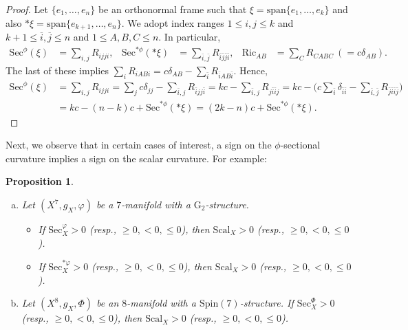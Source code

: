 \documentclass[11pt]{article}
\newcommand{\Spin}{\mathrm{Spin}}
\newcommand{\G}{\mathrm{G}}
\newtheorem{prop}[thm]{Proposition}
\theoremstyle{definition}
\numberwithin{equation}{section}
\begin{document}
\begin{proof} Let $\{e_1, \ldots, e_n\}$ be an orthonormal frame such that $\xi = \mathrm{span}\{e_1, \ldots, e_k\}$ and also $\ast \xi = \mathrm{span}\{e_{k+1}, \ldots, e_n\}$.  We adopt index ranges $1 \leq i,j \leq k$ and $k+1 \leq \overline{i}, \overline{j} \leq n$ and $1 \leq A,B,C \leq n$.  In particular,
\begin{align*}
\mathrm{Sec}^\phi(\xi) & = \sum_{i,j} R_{ijji}, & \mathrm{Sec}^{\ast \phi}(\ast \xi) & = \sum_{\bar{i},\bar{j}} R_{\bar{i} \bar{j} \bar{j} \bar{i}}, & \displaystyle \operatorname{Ric}_{AB} & = \sum_C R_{CABC}\ (=c\delta_{AB}).
\end{align*}
The last of these implies $\displaystyle \sum_i R_{iABi} = c \delta_{AB}- \sum_{\bar{i}} R_{\bar{i} AB \bar{i}}$. Hence,
\begin{align*}
    \mathrm{Sec}^\phi(\xi) & = \sum_{i,j} R_{ijji} = \sum_j c\delta_{jj}- \sum_{\bar{i},j} R_{\bar{i} j j\bar{i}} = kc - \sum_{\bar{i},j} R_{j \bar{i}\bar{i} j} = kc -\Big(c\sum_{\bar{i}} \delta_{\bar{i} \bar{i}} - \sum_{\bar{i},\bar{j}} R_{\bar{j} \bar{i} \bar{i} \bar{j}} \Big)\\
    &= kc - (n-k)c + \mathrm{Sec}^{\ast \phi}(\ast \xi) = (2k-n)c + \mathrm{Sec}^{\ast \phi}(\ast \xi).
\end{align*}
\end{proof}

Next, we observe that in certain cases of interest, a sign on the $\phi$-sectional curvature implies a sign on the scalar curvature.  For example:

\begin{prop} ${}$
\begin{enumerate}[(a)]
\item Let $(X^7, g_X, \varphi)$ be a $7$-manifold with a $\G_2$-structure.
\begin{itemize}
\item If $\mathrm{Sec}^\varphi_X > 0$ (resp., $\geq 0, < 0, \leq 0$), then $\mathrm{Scal}_X > 0$ (resp., $\geq 0, < 0, \leq 0$).
\item If $\mathrm{Sec}^{\ast \varphi}_X > 0$ (resp., $\geq 0, < 0, \leq 0$), then $\mathrm{Scal}_X > 0$ (resp., $\geq 0, < 0, \leq 0$).
\end{itemize}
\item Let $(X^8, g_X, \Phi)$ be an $8$-manifold with a $\Spin(7)$-structure.  If $\mathrm{Sec}^\Phi_X > 0$ (resp., $\geq 0, < 0, \leq 0$), then $\mathrm{Scal}_X > 0$ (resp., $\geq 0, < 0, \leq 0$).
\end{enumerate}
\end{prop}
\end{document}
